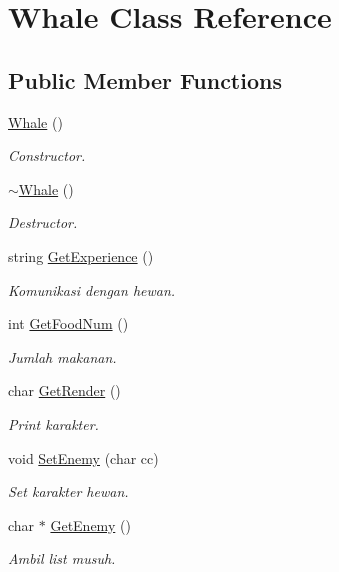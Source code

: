 \hypertarget{class_whale}{}\section{Whale Class Reference}
\label{class_whale}
\subsection*{Public Member Functions}
\begin{DoxyCompactItemize}
\item 
\hyperlink{class_whale_a1a3ee57b92f6fb72ccf0fa12ea118cd7}{Whale} ()\hypertarget{class_whale_a1a3ee57b92f6fb72ccf0fa12ea118cd7}{}\label{class_whale_a1a3ee57b92f6fb72ccf0fa12ea118cd7}

\begin{DoxyCompactList}\small\item\em Constructor. \end{DoxyCompactList}\item 
\hyperlink{class_whale_a7e4401adada746ac7fdca09e1124cf57}{$\sim$\+Whale} ()\hypertarget{class_whale_a7e4401adada746ac7fdca09e1124cf57}{}\label{class_whale_a7e4401adada746ac7fdca09e1124cf57}

\begin{DoxyCompactList}\small\item\em Destructor. \end{DoxyCompactList}\item 
string \hyperlink{class_whale_ac92db95b488e931ab8833e8fd9425dec}{Get\+Experience} ()\hypertarget{class_whale_ac92db95b488e931ab8833e8fd9425dec}{}\label{class_whale_ac92db95b488e931ab8833e8fd9425dec}

\begin{DoxyCompactList}\small\item\em Komunikasi dengan hewan. \end{DoxyCompactList}\item 
int \hyperlink{class_whale_a99f9b8116310ec20606f45ab1b10074c}{Get\+Food\+Num} ()
\begin{DoxyCompactList}\small\item\em Jumlah makanan. \end{DoxyCompactList}\item 
char \hyperlink{class_whale_ad913288ea9c094cef524aae56bbcff7d}{Get\+Render} ()
\begin{DoxyCompactList}\small\item\em Print karakter. \end{DoxyCompactList}\item 
void \hyperlink{class_whale_a0ce85539c71c1fdc3a83e7821cee7f4d}{Set\+Enemy} (char cc)
\begin{DoxyCompactList}\small\item\em Set karakter hewan. \end{DoxyCompactList}\item 
char $\ast$ \hyperlink{class_whale_a1e508ce7b35ba845f016f9f828167623}{Get\+Enemy} ()
\begin{DoxyCompactList}\small\item\em Ambil list musuh. \end{DoxyCompactList}\end{DoxyCompactItemize}
